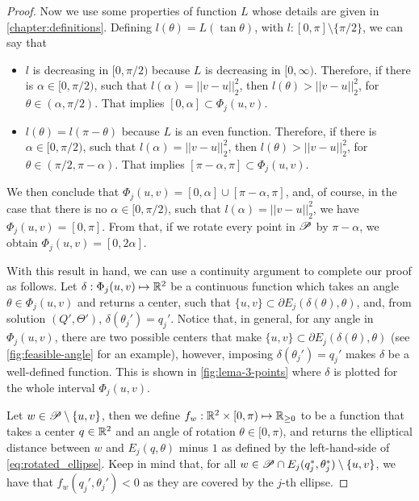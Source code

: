 \begin{proof}
	Now we use some properties of function $L$ whose details are given in \autoref{chapter:definitions}.
	Defining $l(\theta)=L(\tan{\theta})$, with $l:[0, \pi]\setminus\{\pi/2\}$, we can say that
	
	\begin{itemize}
		\item $l$ is decreasing in $[0, \pi/2)$ because $L$ is decreasing in $[0, \infty)$. Therefore, if there is $\alpha\in[0, \pi/2)$, such that $l(\alpha) = ||v-u||_2^2$, then $l(\theta)>||v-u||_2^2$, for $\theta\in(\alpha, \pi/2)$. That implies $[0, \alpha] \subset \Phi_j(u,v)$.
		\item $l(\theta) = l(\pi-\theta)$ because $L$ is an even function. Therefore, if there is $\alpha\in[0, \pi/2)$, such that $l(\alpha) = ||v-u||_2^2$, then $l(\theta)>||v-u||_2^2$, for $\theta\in(\pi/2,\pi-\alpha)$. That implies $[\pi-\alpha, \pi] \subset \Phi_j(u,v)$.
	\end{itemize}
	We then conclude that $\Phi_j(u, v) = [0, \alpha]\cup [\pi-\alpha, \pi]$, and, of course, in the case that there is no $\alpha\in[0, \pi/2)$, such that $l(\alpha)=||v-u||_2^2$, we have $\Phi_j(u,v)=[0, \pi]$.
	From that, if we rotate every point in $\mathscr{P}$ by $\pi-\alpha$, we obtain $\Phi_j(u,v)=[0, 2\alpha]$.
	
	With this result in hand, we can use a continuity argument to complete our proof as follows.
	Let $\delta : \Phi_j(u,v) \mapsto \mathbb{R}^2$ be a continuous function which takes an angle $\theta\in\Phi_j(u,v)$ and returns a center, such that $\{u,v\} \subset \partial E_j(\delta(\theta), \theta)$, and, from solution $(Q', \Theta')$, $\delta(\theta_j') = q_j'$. Notice that, in general, for any angle in $\Phi_j(u,v)$, there are two possible centers that make $\{u,v\} \subset \partial E_j(\delta(\theta), \theta)$ (see \autoref{fig:feasible-angle} for an example), however, imposing $\delta(\theta_j') = q_j'$ makes $\delta$ be a well-defined function. This is shown in \autoref{fig:lema-3-points} where $\delta$ is plotted for the whole interval $\Phi_j(u,v)$.
	
	Let $w\in \mathscr{P} \setminus \{u,v\}$, then we define $f_w  : \mathbb{R}^2 \times [0, \pi) \mapsto \mathbb{R}_{\ge0}$ to be a function that takes a center $q \in \mathbb{R}^2$ and an angle of rotation $\theta\in [0, \pi)$, and returns the elliptical distance between $w$ and $E_j(q, \theta)$ minus $1$ as defined by the left-hand-side of \autoref{eq:rotated_ellipse}. Keep in mind that, for all $w\in \mathscr{P} \cap E_j(q_j^*, \theta_j^*)\setminus \{u,v\}$, we have that $f_w(q_j', \theta_j') < 0$ as they are covered by the $j$-th ellipse.
	

\end{proof}
